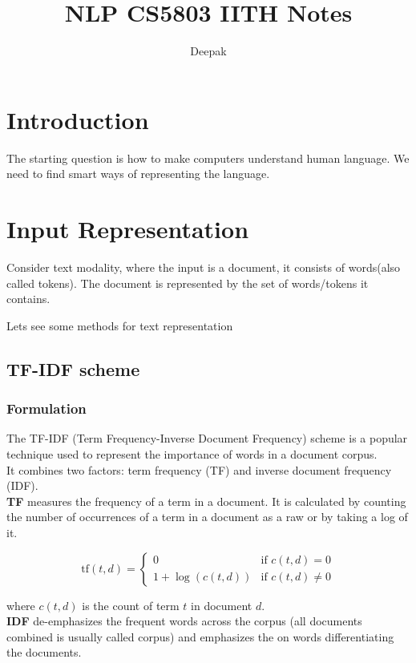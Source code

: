 \documentclass[12pt]{article}
\title{NLP CS5803 IITH Notes}
\author{Deepak}
\begin{document}
\maketitle
\tableofcontents

\newpage

\section{Introduction}
The starting question is how to make computers understand human
language. We need to find smart ways of representing the language.

\section{Input Representation}
    Consider text modality, where the input is a document, it
    consists of words(also called tokens). The document is represented
    by the set of words/tokens it contains.

    Lets see some methods for text representation
    

    \subsection{TF-IDF scheme}

        \subsubsection{Formulation}
            The TF-IDF (Term Frequency-Inverse Document Frequency) scheme is a
            popular technique used to represent the importance of words in a 
            document corpus. \\
            It combines two factors: term frequency (TF) and inverse document frequency (IDF). \\
            \textbf{TF} measures the frequency of a term in a document. 
            It is calculated by counting the number of occurrences of a term 
            in a document as a raw or by taking a log of it.

            \[
            \text{tf}(t, d) = \begin{cases}
                            0 & \text{if } c(t, d) = 0 \\
                            1 + \log(c(t, d)) & \text{if } c(t, d) \neq 0
                        \end{cases}
            \]

            where $c(t, d)$ is the count of term $t$ in document $d$.
            \\
            \textbf{IDF} de-emphasizes the frequent words across the corpus
            (all documents combined is usually called corpus) and emphasizes
            the on words differentiating the documents.
\end{document}
